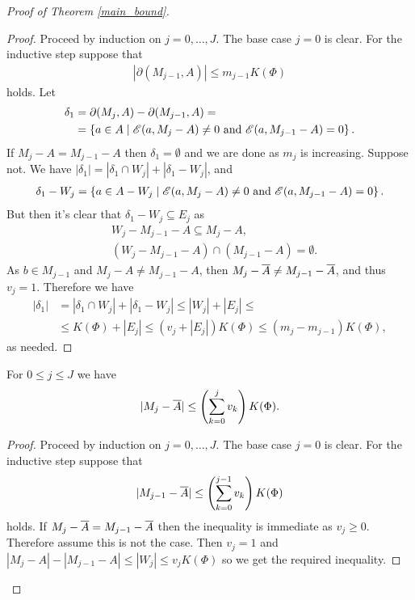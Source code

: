 \begin{proof} [Proof of Theorem \ref{main_bound}]
  \begin{proof} %
    Proceed by induction on $j = 0, \ldots, J$. The base case $j = 0$ is clear.
    For the inductive step suppose that
    \begin{align*}
      |\partial(M_{j-1}, A)| \leq m_{j-1}  K(\Phi)
    \end{align*}
    holds.
    Let
    \begin{align*}
      \delta_1 &= \partial(M_j, A) - \partial(M_{j-1}, A) = \\
               &=\left\{a \in A \mid  \mathscr E(a, M_j - A) \neq 0 \text{ and } \mathscr E(a, M_{j-1} - A) = 0\right\}.
    \end{align*}
    If $M_j - A = M_{j-1} - A$ then $\delta_1 = \emptyset$ and we are done as $m_j$ is increasing.
    Suppose not.
    We have $|\delta_1| = |\delta_1 \cap W_j| + |\delta_1 - W_j|$, and
    \begin{align*}
      \delta_1 - W_j = \left\{a \in A - W_j \mid \mathscr E(a, M_j - A) \neq 0 \text{ and } \mathscr E(a, M_{j-1} - A) = 0\right\}.
    \end{align*}
    But then it's clear that $\delta_1 - W_j \subseteq E_j$ as
    \begin{align*}
      &W_j - M_{j-1} - A \subseteq M_j - A, \\
      &(W_j - M_{j-1} - A) \cap (M_{j-1} - A) = \emptyset.
    \end{align*}
    As $b \in M_{j-1}$ and $M_j - A \neq M_{j-1} - A$, then $M_j - \overline{A} \neq M_{j-1} - \overline{A}$, and thus $v_j = 1$. 
    Therefore we have
    \begin{align*}
      |\delta_1| &= |\delta_1 \cap W_j| + |\delta_1 - W_j| \leq |W_j| + |E_j| \leq \\
      &\leq K(\Phi) + |E_j|
      \leq (v_j + |E_j|) K(\Phi)  \leq (m_j - m_{j-1}) K(\Phi),
    \end{align*}
    as needed.
  \end{proof}

  \begin{Lemma} \label{ub_lemma}
    For $0 \leq j \leq J$ we have
    \begin{align*}
      |M_j - \overline{A}| \leq \left(\sum_{k=0}^j v_{k}\right) K(\Phi).
    \end{align*}
  \end{Lemma}

  \begin{proof} %
    Proceed by induction on $j = 0, \ldots, J$. The base case $j = 0$ is clear.
    For the inductive step suppose that
    \begin{align*}
      |M_{j-1} - \overline{A}| \leq \left(\sum_{k=0}^{j-1} v_{k}\right) K(\Phi)
    \end{align*}
    holds.
    If $M_j - \overline{A} = M_{j-1} - \overline{A}$ then the inequality is immediate as $v_j \geq 0$.
    Therefore assume this is not the case.
    Then $v_j = 1$ and $|M_j - A| - |M_{j-1} - A| \leq |W_j| \leq v_j K(\Phi)$ so we get the required inequality.
  \end{proof}
  

\end{proof}
